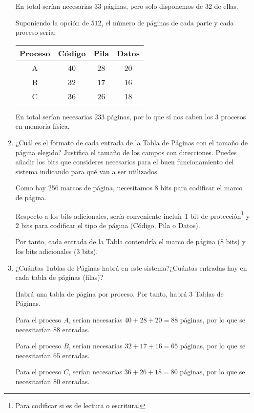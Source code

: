 \begin{ejercicio}
\begin{enumerate}
        
        En total serían necesarias 33 páginas, pero solo disponemos de 32 de ellas.

        Suponiendo la opción de $512$, el número de páginas de cada parte y cada proceso sería:
        \begin{table}[H]
            \centering
            \begin{tabular}{|c|c|c|c|}
                \hline
                \textbf{Proceso} & \textbf{Código} & \textbf{Pila} &
                \textbf{Datos}\\ \hline
                A & 40 & 28 & 20 \\ \hline
                B & 32 & 17 & 16 \\ \hline
                C & 36 & 26 & 18 \\ \hline
            \end{tabular}
        \end{table}
        
        En total serían necesarias 233 páginas, por lo que sí nos caben los 3 procesos en memoria física.

        \item ¿Cuál es el formato de cada entrada de la Tabla de Páginas con el tamaño de página elegido? Justifica el tamaño de los campos con direcciones. Puedes añadir los bits que consideres necesarios para el buen funcionamiento del sistema indicando para qué van a ser utilizados.

        Como hay 256 marcos de página, necesitamos 8 bits para codificar el marco de página.

        Respecto a los bits adicionales, sería conveniente incluir 1 bit de protección\footnote{Para codificar si es de lectura o escritura.} y 2 bits para codificar el tipo de página (Código, Pila o Datos).
        
        Por tanto, cada entrada de la Tabla contendría el marco de página (8 bits) y los bits adicionales (3 bits).

        \item ¿Cuántas Tablas de Páginas habrá en este sistema?¿Cuántas entradas hay en cada tabla de páginas (filas)?

        Habrá una tabla de página por proceso. Por tanto, habrá 3 Tablas de Páginas.

        Para el proceso $A$, serían necesarias $40+28+20=88$ páginas, por lo que se necesitarían 88 entradas.

        Para el proceso $B$, serían necesarias $32+17+16=65$ páginas, por lo que se necesitarían 65 entradas.

        Para el proceso $C$, serían necesarias $36+26+18=80$ páginas, por lo que se necesitarían 80 entradas.
    \end{enumerate}
\end{ejercicio}

